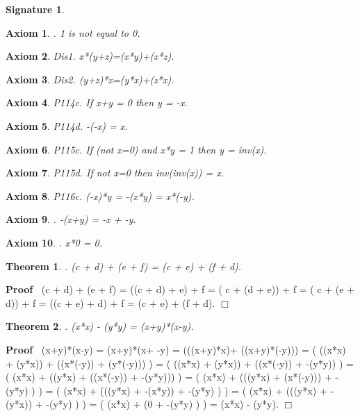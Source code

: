 \documentclass{article}
\newenvironment{forthel}{\begin{leftbar}}{\end{leftbar}}
\newenvironment{proof}{\noindent\textbf{Proof\ }}{\hspace*{\fill}$\Box$\medskip}
\newtheorem{axiom}{Axiom}
\newtheorem{theorem}{Theorem}
\newtheorem{signature}{Signature}
\begin{document}
\begin{forthel}
\begin{signature}
\end{signature}
\begin{axiom}. 1 is not equal to 0.

\end{axiom}

\begin{axiom} Dis1. x*(y+z)=(x*y)+(x*z).

\end{axiom}
\begin{axiom} Dis2. (y+z)*x=(y*x)+(z*x).

\end{axiom}


\begin{axiom} P114c. If x+y = 0 then y = -x.

\end{axiom}
\begin{axiom} P114d. -(-x) = x.

\end{axiom}
\begin{axiom} P115c. If (not x=0) and x*y = 1 then y = inv(x).  

\end{axiom}
\begin{axiom} P115d. If not x=0 then inv(inv(x)) = x.

\end{axiom}
\begin{axiom} P116c. (-x)*y = -(x*y) = x*(-y).

\end{axiom}

\begin{axiom}. -(x+y) = -x + -y. 

\end{axiom}
\begin{axiom}. x*0 = 0. 

\end{axiom}

\begin{theorem}
. (c + d) + (e  + f) = (c + e) + (f   + d).
\end{theorem}\begin{proof}
 (c + d) + (e  + f)	= ((c +  d) +  e)  + f 
= ( c + (d  +  e)) + f 
= ( c + (e  +  d)) + f 
= ((c +  e) +  d)  + f 
=  (c +  e) + (f   + d).
\end{proof}


\begin{theorem}
. (x*x) - (y*y) = (x+y)*(x-y).
\end{theorem}\begin{proof}
 (x+y)*(x-y) 	= (x+y)*(x+ -y) = (((x+y)*x)+ ((x+y)*(-y))) = ( ((x*x) + (y*x)) + ((x*(-y)) + (y*(-y))) )
= ( ((x*x) + (y*x)) + ((x*(-y)) + -(y*y)) )
= ( (x*x) + ((y*x) + ((x*(-y)) + -(y*y))) )
= ( (x*x) + (((y*x) + (x*(-y))) + -(y*y) ) )
= ( (x*x) + (((y*x) + -(x*y)) + -(y*y) ) )
= ( (x*x) + (((y*x) + -(y*x)) + -(y*y) ) )
= ( (x*x) + (0 + -(y*y) ) )
= (x*x) - (y*y).
\end{proof}









\end{forthel}
\end{document}
